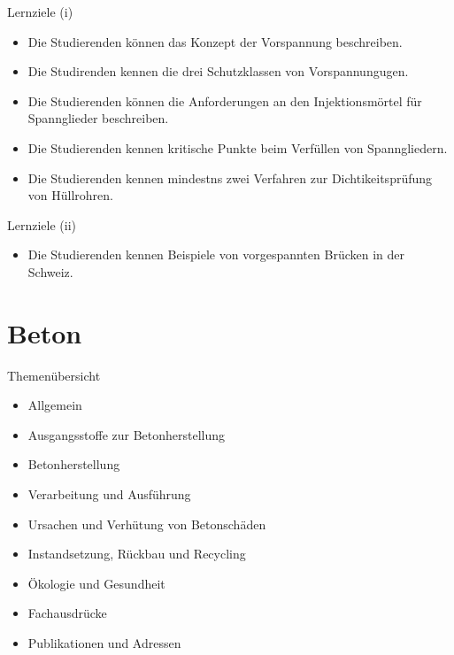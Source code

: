 \begin{frame}{Lernziele (i)}
    \begin{myLernziele}
        \begin{itemize}
            \item [\textbullet] Die Studierenden können das Konzept der Vorspannung beschreiben.
            \item [\textbullet] Die Studirenden kennen die drei Schutzklassen von Vorspannungugen.
            \item [\textbullet] Die Studierenden können die Anforderungen an den Injektionsmörtel für Spannglieder beschreiben.
            \item [\textbullet] Die Studierenden kennen kritische Punkte beim Verfüllen von Spanngliedern.
            \item [\textbullet]  Die Studierenden kennen mindestns zwei Verfahren zur Dichtikeitsprüfung von Hüllrohren.
        \end{itemize}
    \end{myLernziele}

\end{frame}
\begin{frame}{Lernziele (ii)}
    \begin{myLernziele}
        \begin{itemize}
            \item [\textbullet] Die Studierenden kennen Beispiele von vorgespannten Brücken in der Schweiz.
        \end{itemize}
    \end{myLernziele}

\end{frame}




\section{Beton}
\BlueSectionSlide

\begin{frame}{Themenübersicht}
    \begin{itemize}
        \item Allgemein
        \item Ausgangsstoffe zur Betonherstellung
        \item Betonherstellung
        \item Verarbeitung und Ausführung
        \item Ursachen und Verhütung von Betonschäden
        \item Instandsetzung, Rückbau und Recycling
        \item Ökologie und Gesundheit
        \item Fachausdrücke
        \item Publikationen und Adressen
    \end{itemize}
\end{frame}


